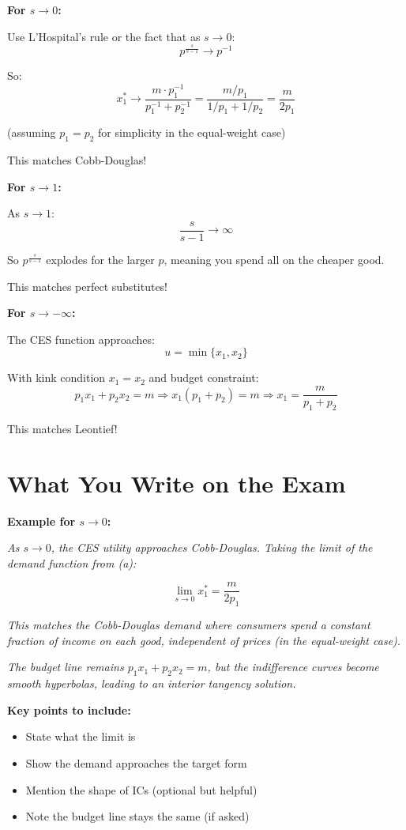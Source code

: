 \documentclass[12pt]{article}
\begin{document}
\textbf{For $s \to 0$:}

Use L'Hospital's rule or the fact that as $s \to 0$:
$$p^{\frac{s}{s-1}} \to p^{-1}$$

So:
$$x_1^* \to \frac{m \cdot p_1^{-1}}{p_1^{-1} + p_2^{-1}} = \frac{m/p_1}{1/p_1 + 1/p_2} = \frac{m}{2p_1}$$

(assuming $p_1 = p_2$ for simplicity in the equal-weight case)

This matches Cobb-Douglas!

\textbf{For $s \to 1$:}

As $s \to 1$:
$$\frac{s}{s-1} \to \infty$$

So $p^{\frac{s}{s-1}}$ explodes for the larger $p$, meaning you spend all on the cheaper good.

This matches perfect substitutes!

\textbf{For $s \to -\infty$:}

The CES function approaches:
$$u = \min\{x_1, x_2\}$$

With kink condition $x_1 = x_2$ and budget constraint:
$$p_1 x_1 + p_2 x_2 = m \Rightarrow x_1(p_1 + p_2) = m \Rightarrow x_1 = \frac{m}{p_1 + p_2}$$

This matches Leontief!

\section*{What You Write on the Exam}

\textbf{Example for $s \to 0$:}

\textit{As $s \to 0$, the CES utility approaches Cobb-Douglas. Taking the limit of the demand function from (a):}

$$\lim_{s \to 0} x_1^* = \frac{m}{2p_1}$$

\textit{This matches the Cobb-Douglas demand where consumers spend a constant fraction of income on each good, independent of prices (in the equal-weight case).}

\textit{The budget line remains $p_1 x_1 + p_2 x_2 = m$, but the indifference curves become smooth hyperbolas, leading to an interior tangency solution.}

\vspace{2em}

\textbf{Key points to include:}
\begin{itemize}
    \item State what the limit is
    \item Show the demand approaches the target form
    \item Mention the shape of ICs (optional but helpful)
    \item Note the budget line stays the same (if asked)
\end{itemize}
\end{document}
